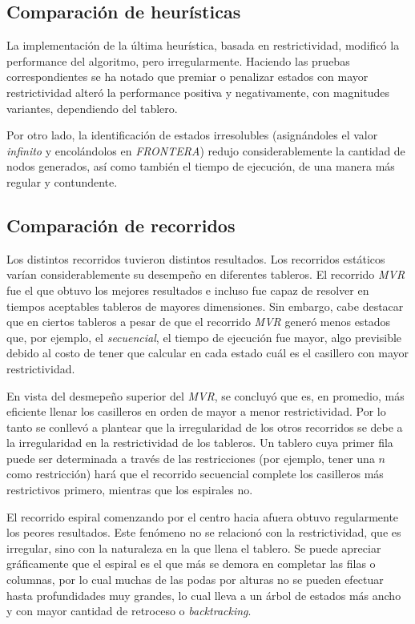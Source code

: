 \documentclass[%
    final,
    reprint,
    notitlepage,
    narroweqnarray,
    inline,
    twoside,
    invited
    ]{ieee}
\begin{document}
\subsection{Comparación de heurísticas}


\par La implementación de la última heurística, basada en restrictividad, modificó la performance del algoritmo, pero irregularmente. 
Haciendo las pruebas correspondientes se ha notado que premiar o penalizar estados con mayor restrictividad alteró la performance positiva y negativamente, con magnitudes variantes, dependiendo del tablero. 
\par Por otro lado, la identificación de estados irresolubles (asignándoles el valor \textit{infinito} y encolándolos en \textit{FRONTERA}) redujo considerablemente la cantidad de nodos generados, así como también el tiempo de ejecución, de una manera más regular y contundente.

\subsection{Comparación de recorridos}

\par  Los distintos recorridos tuvieron distintos resultados. Los recorridos estáticos varían considerablemente su desempeño en diferentes tableros. El 
recorrido \textit{MVR} fue el que obtuvo los mejores resultados e incluso fue capaz de resolver en tiempos aceptables tableros de mayores dimensiones. 
Sin embargo, cabe destacar que en ciertos tableros a pesar de que el recorrido \textit{MVR} generó menos estados que, por ejemplo, el \textit{secuencial}, el tiempo de ejecución 
fue mayor, algo previsible debido al costo de tener que calcular en cada estado cuál es el casillero con mayor restrictividad. 
\par En vista del desmepeño superior 
del \textit{MVR}, se concluyó que es, en promedio, más eficiente llenar los casilleros en orden de mayor a menor restrictividad.
Por lo tanto se conllevó a plantear que la irregularidad de los otros recorridos se debe a la irregularidad en la restrictividad de los tableros. 
Un tablero cuya primer fila puede ser determinada a través de las restricciones (por ejemplo, tener una $n$ como restricción) hará que el recorrido secuencial 
complete los casilleros más restrictivos primero, mientras que los espirales no.
\par El recorrido espiral comenzando por el centro hacia afuera obtuvo regularmente los peores resultados. Este fenómeno no se relacionó con la restrictividad, 
que es irregular, sino con la naturaleza en la que llena el tablero. Se puede apreciar gráficamente que el espiral es el que más se demora en completar las filas 
o columnas, por lo cual muchas de las podas por alturas no se pueden efectuar hasta profundidades muy grandes, lo cual lleva a un árbol de estados más ancho y 
con mayor cantidad de retroceso o \textit{backtracking}.
\end{document}
